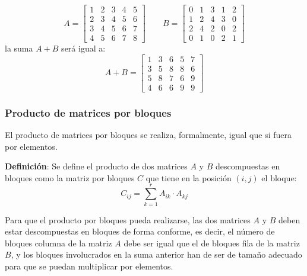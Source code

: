 \[
  A= \left[\begin{array}{c|cc|cc}
    1 & 2 & 3 & 4 & 5 \\
    2 & 3 & 4 & 5 & 6 \\
    3 & 4 & 5 & 6 & 7 \\
    \hline
    4 & 5 & 6 & 7 & 8
  \end{array}\right] \qquad 
  B= \left[\begin{array}{c|cc|cc}
    0 & 1 & 3 & 1 & 2 \\
    1 & 2 & 4 & 3 & 0 \\
    2 & 4 & 2 & 0 & 2 \\
    \hline
    0 & 1 & 0 & 2 & 1
  \end{array}\right]
\]
la suma \(A+B\) será igual a: 
\[
A + B = \left[\begin{array}{c|cc|cc}
  1 & 3 & 6 & 5 & 7 \\
  3 & 5 & 8 & 8 & 6 \\
  5 & 8 & 7 & 6 & 9 \\
  \hline
  4 & 6 & 6 & 9 & 9
\end{array}\right]
\]

\subsubsection{Producto de matrices por bloques}

El producto de matrices por bloques se realiza, formalmente, igual que si fuera por elementos.

\textbf{Definición}: Se define el producto de dos matrices \(A\) y \(B\) descompuestas en bloques como la matriz por bloques \(C\) que tiene en la posición \((i,j)\) el bloque:
\[
  C_{ij} = \sum_{k=1}^r A_{ik} \cdot A_{kj}
\]

Para que el producto por bloques pueda realizarse, las dos matrices \(A\) y \(B\) deben estar descompuestas en bloques de forma conforme, es decir, el número de bloques columna de la matriz \(A\) debe ser igual que el de bloques fila de la matriz \(B\), y los bloques involucrados en la suma anterior han de ser de tamaño adecuado para que se puedan multiplicar por elementos.

